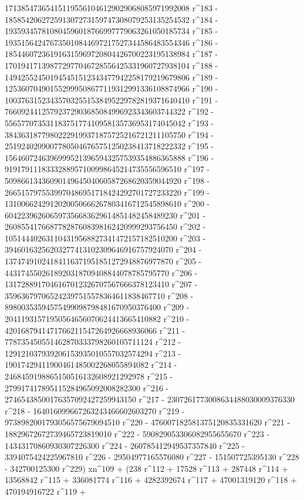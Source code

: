        171385473654151195561046129029068085971992008 r^183 - 
       185854206272591307273159747308079253135254532 r^184 - 
       193593457810804596018766997779063261050185734 r^185 - 
       193515642476735010844697217527344586483554346 r^186 - 
       185446072361916315969720804426700223195138984 r^187 - 
       170194171398772977046728556425331960727938104 r^188 - 
       149425524501945451512343477942258179219679806 r^189 - 
       125360704901552999508677119312991336108874966 r^190 - 
       100376315234357032551538495229782819371640410 r^191 - 
       76609244125792372903685084996923343603744322 r^192 - 
       55657707353118375177410958135736953174045042 r^193 - 
       38436318779802229199371875725216721211105750 r^194 - 
       25192402090077805046765751250238413718222332 r^195 - 
       15646072463969995213965943257539354886365888 r^196 - 
       9191791118333288957100998645214735556596510 r^197 - 
       5098661343609014964504060587268620359044920 r^198 - 
       2665157975539970486951718424292701727233220 r^199 - 
       1310066242912020050666267803416712545898610 r^200 - 
       604223962606597356683629614851482458489230 r^201 - 
       260855417668778287608398162420999293756450 r^202 - 
       105144402631104319568827341472157182510200 r^203 - 
       39460163256203277413102309646916757924070 r^204 - 
       13747491024184116371951851272948876977870 r^205 - 
       4431745502618920318709408844078785795770 r^206 - 
       1317288917046167012326707567666378123410 r^207 - 
       359636797065242397515578364611838467710 r^208 - 
       89800353594575499098798481670950376400 r^209 - 
       20411931571950564656070624413665410882 r^210 - 
       4201687941471766211547264926668936066 r^211 - 
       778735450551462870333798260105711124 r^212 - 
       129121037939206153935010557032574294 r^213 - 
       19017429411900461485002268055894082 r^214 - 
       2468459198865150516132608921292978 r^215 - 
       279917417895115284965092008282300 r^216 - 
       27465438500176357092427259943150 r^217 - 
       2307261773008634488030009376330 r^218 - 
       164016099667263243466602603270 r^219 - 
       9738982001793056575679094510 r^220 - 
       476007182581375120835331620 r^221 - 
       18829672672739465723819010 r^222 - 
       590829053306082955655670 r^223 - 
       14343170860930307226300 r^224 - 260785412949537357840 r^225 - 
       3394075424225967810 r^226 - 29504977165576080 r^227 - 
       151507725395130 r^228 - 
       342700125300 r^229) xn^109 + (238 r^112 + 17528 r^113 + 
       287448 r^114 + 13568842 r^115 + 336081774 r^116 + 
       4282392674 r^117 + 47001319120 r^118 + 470194916722 r^119 + 
